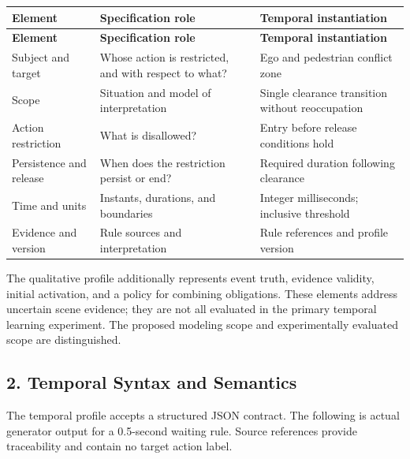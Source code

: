 \documentclass[11pt,a4paper]{article}
\begin{document}
\begingroup\small
\begin{longtable}{@{}>{\raggedright\arraybackslash}p{}>{\raggedright\arraybackslash}p{}>{\raggedright\arraybackslash}p{}@{}}
\toprule
\textbf{Element} & \textbf{Specification role} & \textbf{Temporal instantiation} \\
\midrule\endfirsthead
\toprule
\textbf{Element} & \textbf{Specification role} & \textbf{Temporal instantiation} \\
\midrule\endhead
\bottomrule\endfoot
Subject and target & Whose action is restricted, and with respect to what? & Ego and pedestrian conflict zone \\
Scope & Situation and model of interpretation & Single clearance transition without reoccupation \\
Action restriction & What is disallowed? & Entry before release conditions hold \\
Persistence and release & When does the restriction persist or end? & Required duration following clearance \\
Time and units & Instants, durations, and boundaries & Integer milliseconds; inclusive threshold \\
Evidence and version & Rule sources and interpretation & Rule references and profile version \\
\end{longtable}
\endgroup

The qualitative profile additionally represents event truth, evidence validity, initial activation, and a policy for combining obligations. These elements address uncertain scene evidence; they are not all evaluated in the primary temporal learning experiment. The proposed modeling scope and experimentally evaluated scope are distinguished.\par

\subsection*{2. Temporal Syntax and Semantics}

The temporal profile accepts a structured JSON contract. The following is actual generator output for a 0.5-second waiting rule. Source references provide traceability and contain no target action label.\par
\end{document}
